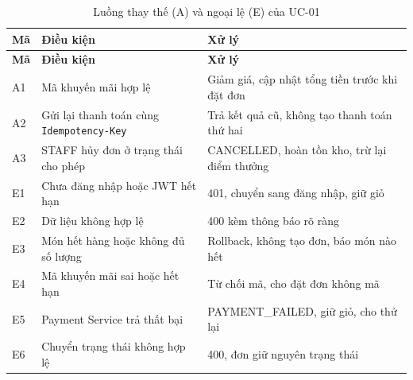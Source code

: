 \begin{longtable}{@{}p{1cm}p{5.6cm}p{6.7cm}@{}}
\caption{Luồng thay thế (A) và ngoại lệ (E) của UC-01}\label{tab:uc01-alt}\\
\toprule \textbf{Mã} & \textbf{Điều kiện} & \textbf{Xử lý} \\ \midrule \endfirsthead
\toprule \textbf{Mã} & \textbf{Điều kiện} & \textbf{Xử lý} \\ \midrule \endhead
\bottomrule \endlastfoot
A1 & Mã khuyến mãi hợp lệ & Giảm giá, cập nhật tổng tiền trước khi đặt đơn \\
A2 & Gửi lại thanh toán cùng \texttt{Idempotency-Key} & Trả kết quả cũ, không tạo thanh toán thứ hai \\
A3 & STAFF hủy đơn ở trạng thái cho phép & CANCELLED, hoàn tồn kho, trừ lại điểm thưởng \\
E1 & Chưa đăng nhập hoặc JWT hết hạn & 401, chuyển sang đăng nhập, giữ giỏ \\
E2 & Dữ liệu không hợp lệ & 400 kèm thông báo rõ ràng \\
E3 & Món hết hàng hoặc không đủ số lượng & Rollback, không tạo đơn, báo món nào hết \\
E4 & Mã khuyến mãi sai hoặc hết hạn & Từ chối mã, cho đặt đơn không mã \\
E5 & Payment Service trả thất bại & PAYMENT\_FAILED, giữ giỏ, cho thử lại \\
E6 & Chuyển trạng thái không hợp lệ & 400, đơn giữ nguyên trạng thái \\
\end{longtable}
